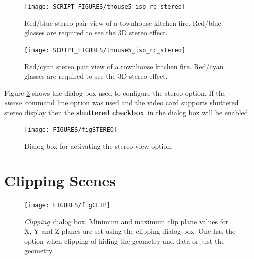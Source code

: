 \documentclass[11pt,twoside]{book}
\begin{document}
\begin{figure}[\figoptions]
\begin{center}
\texttt{[image: SCRIPT\_FIGURES/thouse5\_iso\_rb\_stereo]}\\
\caption[Red/blue stereo pair view of a townhouse kitchen fire.]{
Red/blue stereo pair view of a townhouse kitchen fire. Red/blue
glasses are required to see the 3D stereo effect. }
\label{figrbstereo}
\end{center}
\end{figure}

\begin{figure}[\figoptions]
\begin{center}
\texttt{[image: SCRIPT\_FIGURES/thouse5\_iso\_rc\_stereo]}\\
\caption[Red/cyan stereo pair view of a townhouse kitchen fire.]{
Red/cyan stereo pair view of a townhouse kitchen fire. Red/cyan
glasses are required to see the 3D stereo effect. }
\label{figrcstereo}
\end{center}
\end{figure}

Figure \ref{figstereodialog} shows the dialog box used to
configure the stereo option.  If the {\em -stereo}\ command line
option was used and the video card supports shuttered stereo
display then the {\bf shuttered checkbox}\ in the dialog box will
be enabled.

\begin{figure}[\figoptions]
\begin{center}
\texttt{[image: FIGURES/figSTEREO]}
\caption{Dialog box for activating the stereo view option.}
\label{figstereodialog}
\end{center}
\end{figure}
\section{Clipping Scenes}


\begin{figure}[\figoptions]
\begin{center}
\texttt{[image: FIGURES/figCLIP]}
\end{center}
\caption[{\em Clipping}\ dialog box.]{{\em Clipping}\ dialog box.
Minimum and maximum clip plane values for X, Y and Z planes are
set using the clipping dialog box.  One has the option when
clipping of hiding the geometry and data or just the geometry. }
\label{figCLIP}
\end{figure}
\end{document}

